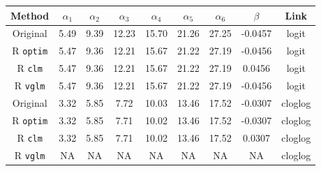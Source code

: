 
\begin{tabular}{ccccccccc}
\toprule
Method & $\alpha_1$ & $\alpha_2$ & $\alpha_3$ & $\alpha_4$ & $\alpha_5$ & $\alpha_6$ & $\beta$ & Link\\
\midrule
Original \citep{candy1991modeling} & 5.49 & 9.39 & 12.23 & 15.70 & 21.26 & 27.25 & -0.0457 & logit\\
R \verb+optim+ & 5.47 & 9.36 & 12.21 & 15.67 & 21.22 & 27.19 & -0.0456 & logit\\
R \verb+clm+ & 5.47 & 9.36 & 12.21 & 15.67 & 21.22 & 27.19 & 0.0456 & logit\\
R \verb+vglm+ & 5.47 & 9.36 & 12.21 & 15.67 & 21.22 & 27.19 & -0.0456 & logit\\
\addlinespace
Original \citep{candy1991modeling} & 3.32 & 5.85 & 7.72 & 10.03 & 13.46 & 17.52 & -0.0307 & cloglog\\
R \verb+optim+ & 3.32 & 5.85 & 7.71 & 10.02 & 13.46 & 17.52 & -0.0307 & cloglog\\
R \verb+clm+ & 3.32 & 5.85 & 7.71 & 10.02 & 13.46 & 17.52 & 0.0307 & cloglog\\
R \verb+vglm+ & NA & NA & NA & NA & NA & NA & NA & cloglog\\
\bottomrule
\end{tabular}
